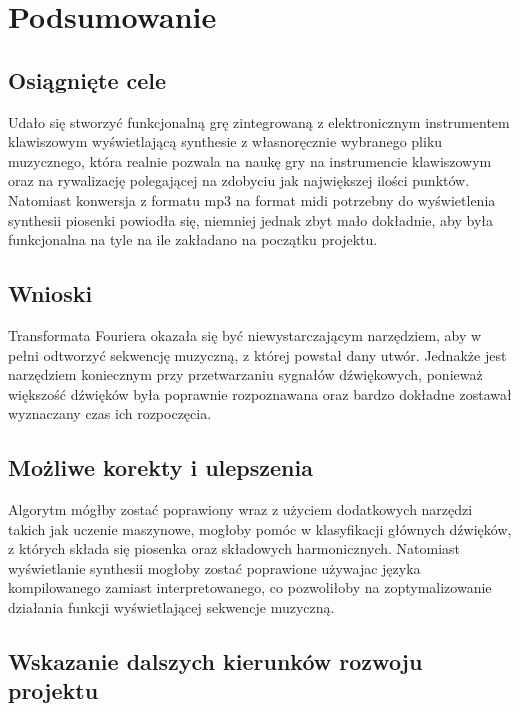 \chapter{Podsumowanie}
\vspace{-25pt}

\section{Osiągnięte cele}

Udało się stworzyć funkcjonalną grę zintegrowaną z elektronicznym instrumentem klawiszowym wyświetlającą synthesie z własnoręcznie wybranego pliku muzycznego, która realnie pozwala na naukę gry na instrumencie klawiszowym oraz na rywalizację polegającej na zdobyciu jak największej ilości punktów. Natomiast konwersja z formatu mp3 na format midi potrzebny do wyświetlenia synthesii piosenki powiodła się, niemniej jednak zbyt mało dokładnie, aby była funkcjonalna na tyle na ile zakładano na początku projektu.

\section{Wnioski}

Transformata Fouriera okazała się być niewystarczającym narzędziem, aby w pełni odtworzyć sekwencję muzyczną, z której powstał dany utwór. Jednakże jest narzędziem koniecznym przy przetwarzaniu sygnałów dźwiękowych, ponieważ większość dźwięków była poprawnie rozpoznawana oraz bardzo dokładne zostawał wyznaczany czas ich rozpoczęcia. 

\section{Możliwe korekty i ulepszenia}

Algorytm mógłby zostać poprawiony wraz z użyciem dodatkowych narzędzi takich jak uczenie maszynowe, mogłoby pomóc w klasyfikacji głównych dźwięków, z których składa się piosenka oraz składowych harmonicznych.
Natomiast wyświetlanie synthesii mogłoby zostać poprawione używajac języka kompilowanego zamiast interpretowanego, co pozwoliłoby na zoptymalizowanie działania funkcji wyświetlającej sekwencje muzyczną.

\section{Wskazanie dalszych kierunków rozwoju projektu}

